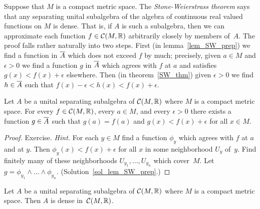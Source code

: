 Suppose that $M$ is a compact metric space. The \emph{Stone-Weierstrass theorem} says that any
separating unital subalgebra of the algebra of continuous real valued functions on $M$ is
dense.  That is, if $A$ is such a subalgebra, then we can approximate each function $f \in
\mathcal{C}(M,\mathbb{R})$ arbitrarily closely by members of~$A$.  The proof falls rather naturally into
two steps.  First (in lemma~\ref{lem_SW_prep}) we find a function in $\overline{A}$ which does not
exceed $f$ by much; precisely, given $a \in M$ and $\epsilon > 0$ we find a function $g$ in
$\overline{A}$ which agrees with $f$ at $a$ and satisfies $g(x) < f(x) + \epsilon$ elsewhere.  Then
(in theorem~\ref{SW_thm}) given $\epsilon > 0$ we find $h \in \overline{A}$ such that $f(x) -
\epsilon < h(x) < f(x) + \epsilon$.

\begin{lem}\label{lem_SW_prep}  Let $A$ be a unital separating subalgebra of $\mathcal{C}(M,\mathbb{R})$
where $M$ is a compact metric space.  For every $f \in \mathcal{C}(M,\mathbb{R})$, every $a \in M$, and
every $\epsilon > 0$ there exists a function $g \in \overline{A}$ such that $g(a) = f(a)$ and $g(x)
< f(x) + \epsilon$ for all $x \in M$.
\end{lem}

\begin{proof} Exercise.   \emph{Hint.} For each $y \in M$ find a
function $\phi_y$ which agrees with $f$ at $a$ and at $y$.  Then $\phi_y(x) < f(x) + \epsilon$
for all $x$ in some neighborhood $U_y$ of~$y$.  Find finitely many of these neighborhoods
$U_{y_1}, \dots, U_{y_n}$ which cover~$M$.  Let $g = \phi_{y_1} \land \dots \land \phi_{y_n}$.
(Solution~\ref{sol_lem_SW_prep}.)    \ns
\end{proof}

\begin{thm}\label{SW_thm}
Let $A$ be a unital separating subalgebra of $\mathcal{C}(M,\mathbb{R})$ where $M$ is a compact metric
space.  Then $A$ is dense in~$\mathcal{C}(M,\mathbb{R})$.
\end{thm}

